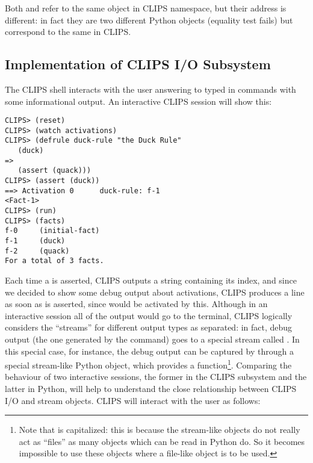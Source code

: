 Both  and  refer to the same object in CLIPS namespace,
but their address is different: in fact they are two different Python
objects (equality test fails) but correspond to the same  in
CLIPS.

\begin{seealso}
\sclipsbpg{}
\end{seealso}


\subsection{Implementation of CLIPS I/O Subsystem\label{pyclips-ov-io}}

The CLIPS shell interacts with the user answering to typed in commands
with some informational output. An interactive CLIPS session will show
this:

\begin{verbatim}
CLIPS> (reset)
CLIPS> (watch activations)
CLIPS> (defrule duck-rule "the Duck Rule"
   (duck)
=>
   (assert (quack)))
CLIPS> (assert (duck))
==> Activation 0      duck-rule: f-1
<Fact-1>
CLIPS> (run)
CLIPS> (facts)
f-0     (initial-fact)
f-1     (duck)
f-2     (quack)
For a total of 3 facts.
\end{verbatim}

Each time a  is asserted, CLIPS outputs a string containing
its index, and since we decided to show some debug output about
activations, CLIPS produces a line as soon as  is asserted,
since  would be activated by this. Although in an
interactive session all of the output would go to the terminal, CLIPS
logically considers the ``streams'' for different output types as
separated: in fact, debug output (the one generated by the 
command) goes to a special stream called . In this special
case, for instance, the debug output can be captured by \pyclips{}
through a special stream-like Python object, which provides a
 function\footnote{Note that  is
capitalized: this is because the stream-like objects do not really act
as ``files'' as many objects which can be read in Python do. So it
becomes impossible to use these \pyclips{} objects where a file-like
object is to be used.}. Comparing the behaviour of two interactive
sessions, the former in the CLIPS subsystem and the latter in Python,
will help to understand the close relationship between CLIPS I/O and
\pyclips{} stream objects. CLIPS will interact with the user as
follows:

